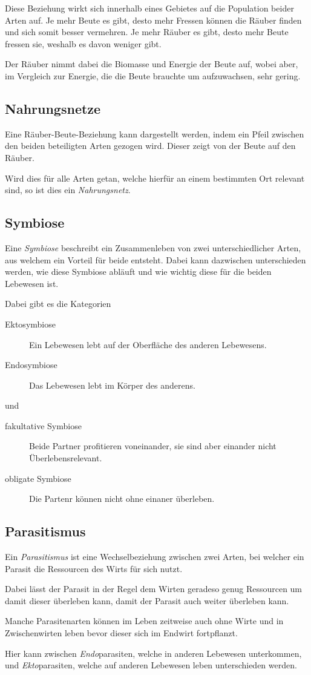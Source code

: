 \documentclass{article}
\begin{document}
Diese Beziehung wirkt sich innerhalb eines Gebietes auf die Population beider Arten auf. Je mehr Beute es gibt, desto mehr Fressen können die Räuber finden und sich somit besser vermehren. Je mehr Räuber es gibt, desto mehr Beute fressen sie, weshalb es davon weniger gibt.
 
Der Räuber nimmt dabei die Biomasse und Energie der Beute auf, wobei aber, im Vergleich zur Energie, die die Beute brauchte um aufzuwachsen, sehr gering. 
 
\subsection{Nahrungsnetze}
Eine Räuber-Beute-Beziehung kann dargestellt werden, indem ein Pfeil zwischen den beiden beteiligten Arten gezogen wird. Dieser zeigt von der Beute auf den Räuber. 
 
Wird dies für alle Arten getan, welche hierfür an einem bestimmten Ort relevant sind, so ist dies ein \emph{Nahrungsnetz}.
 
\subsection{Symbiose}
Eine \emph{Symbiose} beschreibt ein Zusammenleben von zwei unterschiedlicher Arten, aus welchem ein Vorteil für beide entsteht. Dabei kann dazwischen unterschieden werden, wie diese Symbiose abläuft und wie wichtig diese für die beiden Lebewesen ist. 
 
Dabei gibt es die Kategorien 
\begin{description}
 \item[Ektosymbiose] Ein Lebewesen lebt auf der Oberfläche des anderen Lebewesens.
 \item[Endosymbiose] Das Lebewesen lebt im Körper des anderens.
\end{description}
und 
\begin{description}
 \item[fakultative Symbiose] Beide Partner profitieren voneinander, sie sind aber einander nicht Überlebensrelevant.
 \item[obligate Symbiose] Die Partenr können nicht ohne einaner überleben.
\end{description}
 
\subsection{Parasitismus}
Ein \emph{Parasitismus} ist eine Wechselbeziehung zwischen zwei Arten, bei welcher ein Parasit die Ressourcen des Wirts für sich nutzt.
 
Dabei lässt der Parasit in der Regel dem Wirten geradeso genug Ressourcen um damit dieser überleben kann, damit der Parasit auch weiter überleben kann.
 
Manche Parasitenarten können im Leben zeitweise auch ohne Wirte und in Zwischenwirten leben bevor dieser sich im Endwirt fortpflanzt.
 
Hier kann zwischen \emph{Endo}parasiten, welche in anderen Lebewesen unterkommen, und \emph{Ekto}parasiten, welche auf anderen Lebewesen leben unterschieden werden.
 
\end{document}
